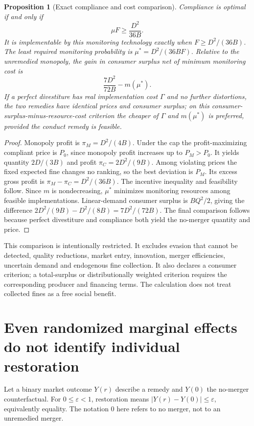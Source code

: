 \documentclass[11pt]{article}
\newtheorem{proposition}[theorem]{Proposition}
\theoremstyle{remark}\newtheorem{remark}[theorem]{Remark}
\begin{document}
\begin{proposition}[Exact compliance and cost comparison]
Compliance is optimal if and only if
\[
 \mu F\ge\frac{D^2}{36B}.
\]
It is implementable by this monitoring technology exactly when $F\ge D^2/(36B)$. The least required monitoring probability is $\mu^*=D^2/(36BF)$. Relative to the unremedied monopoly, the gain in consumer surplus net of minimum monitoring cost is
\[
 \frac{7D^2}{72B}-m(\mu^*).
\]
If a perfect divestiture has real implementation cost $\Gamma$ and no further distortions, the two remedies have identical prices and consumer surplus; on this consumer-surplus-minus-resource-cost criterion the cheaper of $\Gamma$ and $m(\mu^*)$ is preferred, provided the conduct remedy is feasible.
\end{proposition}
\begin{proof}
Monopoly profit is $\pi_M=D^2/(4B)$. Under the cap the profit-maximizing compliant price is $P_0$, since monopoly profit increases up to $P_M>P_0$. It yields quantity $2D/(3B)$ and profit $\pi_C=2D^2/(9B)$. Among violating prices the fixed expected fine changes no ranking, so the best deviation is $P_M$. Its excess gross profit is $\pi_M-\pi_C=D^2/(36B)$. The incentive inequality and feasibility follow. Since $m$ is nondecreasing, $\mu^*$ minimizes monitoring resources among feasible implementations. Linear-demand consumer surplus is $BQ^2/2$, giving the difference $2D^2/(9B)-D^2/(8B)=7D^2/(72B)$. The final comparison follows because perfect divestiture and compliance both yield the no-merger quantity and price.
\end{proof}

This comparison is intentionally restricted. It excludes evasion that cannot be detected, quality reductions, market entry, innovation, merger efficiencies, uncertain demand and endogenous fine collection. It also declares a consumer criterion; a total-surplus or distributionally weighted criterion requires the corresponding producer and financing terms. The calculation does not treat collected fines as a free social benefit.

\section*{Even randomized marginal effects do not identify individual restoration}
Let a binary market outcome $Y(r)$ describe a remedy and $Y(0)$ the no-merger counterfactual. For $0\le\varepsilon<1$, restoration means $|Y(r)-Y(0)|\le\varepsilon$, equivalently equality. The notation $0$ here refers to no merger, not to an unremedied merger.
\end{document}
